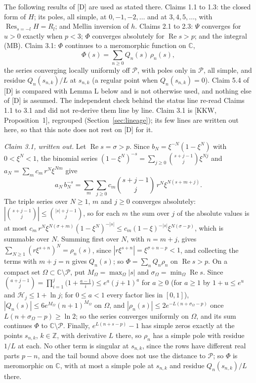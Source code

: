 \documentclass[11pt]{article}
\newcommand{\re}{\operatorname{Re}}
\newcommand{\Res}{\operatorname{Res}}
\newcommand{\Har}{\mathcal{H}}
\begin{document}
The following results of [D] are used as stated there. Claims 1.1 to 1.3: the closed form of $H$; its poles, all simple, at $0,-1,-2,\dots$ and at $3,4,5,\dots$, with $\Res_{s=-l}H=R_l$; and Mellin inversion of $h$. Claims 2.1 to 2.3: $\Psi$ converges for $u>0$ exactly when $p<3$; $\Phi$ converges absolutely for $\re s>p$; and the integral (MB). Claim 3.1: $\Phi$ continues to a meromorphic function on $\mathbb{C}$,
\[
\Phi(s)=\sum_{n\ge0}Q_n(s)\,\rho_n(s),
\]
the series converging locally uniformly off $\mathcal{P}$, with poles only in $\mathcal{P}$, all simple, and residue $Q_n(s_{n,k})/L$ at $s_{n,k}$ (a regular point when $Q_n(s_{n,k})=0$). Claim 5.4 of [D] is compared with Lemma L below and is not otherwise used, and nothing else of [D] is assumed. The independent check behind the status line re-read Claims 1.1 to 3.1 and did not re-derive them line by line. Claim 3.1 is [KKW, Proposition~1], regrouped (Section~\ref{sec:lineage}); its few lines are written out here, so that this note does not rest on [D] for it.

\noindent\emph{Claim 3.1, written out.} Let $\re s=\sigma>p$. Since $b_N=\xi^{-N}(1-\xi^N)$ with $0<\xi^N<1$, the binomial series $(1-\xi^N)^{-s}=\sum_{j\ge0}\binom{s+j-1}{j}\xi^{Nj}$ and $a_N=\sum_mc_m\,r^N\xi^{Nm}$ give
\[
a_N\,b_N^{-s}=\sum_{m}\sum_{j\ge0}c_m\binom{s+j-1}{j}\,r^N\xi^{N(s+m+j)}.
\]
The triple series over $N\ge1$, $m$ and $j\ge0$ converges absolutely: $|\binom{s+j-1}{j}|\le\binom{|s|+j-1}{j}$, so for each $m$ the sum over $j$ of the absolute values is at most $c_m\,r^N\xi^{N(\sigma+m)}(1-\xi^N)^{-|s|}\le c_m(1-\xi)^{-|s|}\xi^{N(\sigma-p)}$, which is summable over $N$. Summing first over $N$, with $n=m+j$, gives $\sum_{N\ge1}(r\xi^{s+n})^N=\rho_n(s)$, since $|r\xi^{s+n}|=\xi^{\sigma+n-p}<1$, and collecting the terms with $m+j=n$ gives $Q_n(s)$; so $\Phi=\sum_nQ_n\rho_n$ on $\re s>p$. On a compact set $\Omega\subset\mathbb{C}\setminus\mathcal{P}$, put $M_\Omega=\max_\Omega|s|$ and $\sigma_\Omega=\min_\Omega\re s$. Since $\binom{a+j-1}{j}=\prod_{i=1}^j\bigl(1+\frac{a-1}{i}\bigr)\le e^a(j+1)^a$ for $a\ge0$ (for $a\ge1$ by $1+u\le e^u$ and $\Har_j\le1+\ln j$; for $0\le a<1$ every factor lies in $[0,1]$), $|Q_n(s)|\le6e^{M_\Omega}(n+1)^{M_\Omega}$ on $\Omega$, and $|\rho_n(s)|\le2e^{-L(n+\sigma_\Omega-p)}$ once $L(n+\sigma_\Omega-p)\ge\ln2$; so the series converges uniformly on $\Omega$, and its sum continues $\Phi$ to $\mathbb{C}\setminus\mathcal{P}$. Finally, $e^{L(n+s-p)}-1$ has simple zeros exactly at the points $s_{n,k}$, $k\in\mathbb{Z}$, with derivative $L$ there, so $\rho_n$ has a simple pole with residue $1/L$ at each. No other term is singular at $s_{n,k}$, since the rows have different real parts $p-n$, and the tail bound above does not use the distance to $\mathcal{P}$; so $\Phi$ is meromorphic on $\mathbb{C}$, with at most a simple pole at $s_{n,k}$ and residue $Q_n(s_{n,k})/L$ there.
\end{document}
